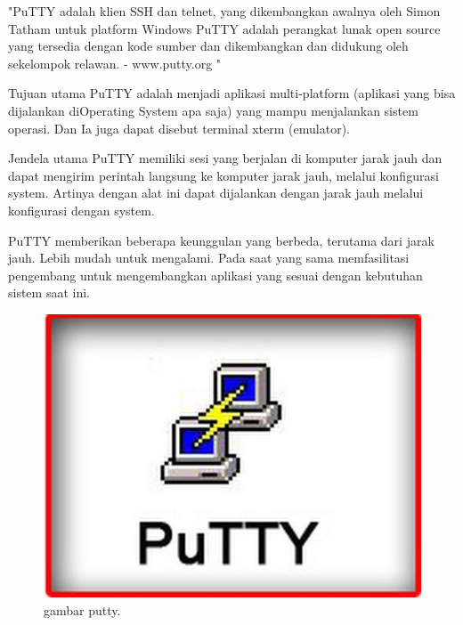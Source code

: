 "PuTTY adalah klien SSH dan telnet, yang dikembangkan awalnya oleh Simon Tatham untuk platform Windows PuTTY adalah perangkat lunak open source yang tersedia dengan kode sumber dan dikembangkan dan didukung oleh sekelompok relawan.
- www.putty.org "

Tujuan utama PuTTY adalah menjadi aplikasi multi-platform (aplikasi yang bisa dijalankan diOperating System apa saja) yang mampu menjalankan sistem operasi. Dan Ia juga dapat disebut terminal xterm (emulator).

Jendela utama PuTTY memiliki sesi yang berjalan di komputer jarak jauh dan dapat mengirim perintah langsung ke komputer jarak jauh, melalui konfigurasi system. Artinya dengan alat ini dapat dijalankan dengan jarak jauh melalui konfigurasi dengan system.

PuTTY memberikan beberapa keunggulan yang berbeda, terutama dari jarak jauh. Lebih mudah untuk mengalami. Pada saat yang sama memfasilitasi pengembang untuk mengembangkan aplikasi yang sesuai dengan kebutuhan sistem saat ini. 

\begin{figure}[ht]
\centerline{\includegraphics[width=1\textwidth]{figures/puttyexe.jpg}}
\caption{gambar putty.}
\label{putty}
\end{figure}


